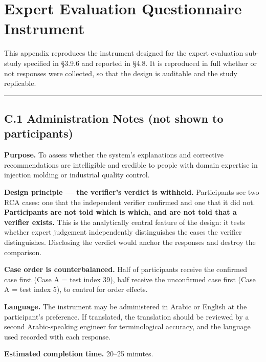 \hypertarget{expert-evaluation-questionnaire-instrument}{%
\chapter{Expert Evaluation Questionnaire Instrument}\label{expert-evaluation-questionnaire-instrument}}

This appendix reproduces the instrument designed for the expert evaluation sub-study specified in §3.9.6 and reported in §4.8. It is reproduced in full whether or not responses were collected, so that the design is auditable and the study replicable.

\begin{center}\rule{0.5\linewidth}{0.5pt}\end{center}

\hypertarget{c.1-administration-notes-not-shown-to-participants}{%
\section{C.1 Administration Notes (not shown to participants)}\label{c.1-administration-notes-not-shown-to-participants}}

\textbf{Purpose.} To assess whether the system's explanations and corrective recommendations are intelligible and credible to people with domain expertise in injection molding or industrial quality control.

\textbf{Design principle --- the verifier's verdict is withheld.} Participants see two RCA cases: one that the independent verifier confirmed and one that it did not. \textbf{Participants are not told which is which, and are not told that a verifier exists.} This is the analytically central feature of the design: it tests whether expert judgement independently distinguishes the cases the verifier distinguishes. Disclosing the verdict would anchor the responses and destroy the comparison.

\textbf{Case order is counterbalanced.} Half of participants receive the confirmed case first (Case A = test index 39), half receive the unconfirmed case first (Case A = test index 5), to control for order effects.

\textbf{Language.} The instrument may be administered in Arabic or English at the participant's preference. If translated, the translation should be reviewed by a second Arabic-speaking engineer for terminological accuracy, and the language used recorded with each response.

\textbf{Estimated completion time.} 20--25 minutes.

